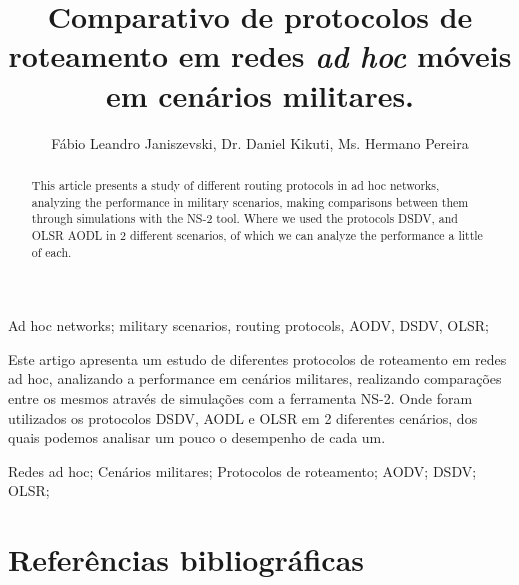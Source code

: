\documentclass[12pt]{article}
\title{Comparativo de protocolos de roteamento em redes \textit{ad hoc} m\'oveis em cen\'arios militares.}
\author{
	F\'abio Leandro Janiszevski\inst{1}, 
	Dr. Daniel Kikuti\inst{1}, 
	Ms. Hermano Pereira\inst{2}
}
\begin{document}
  \setlength{\leftmargini}{1.70cm}
  \setlength{\labelsep}{.5em}
  \setlength{\parindent}{1.27cm}
  \setlength{\parskip}{6pt}

\maketitle

\begin{abstract}
This article presents a study of different routing protocols in ad hoc networks, analyzing the performance in military scenarios, making comparisons between them through simulations with the NS-2 tool.
Where we used the protocols DSDV, and OLSR AODL in 2 different scenarios, of which we can analyze the performance a little of each.
\end{abstract}

\begin{keyWord}
Ad hoc networks; military scenarios, routing protocols, AODV, DSDV, OLSR;
\end{keyWord}

\begin{resumo}
Este artigo apresenta um estudo de diferentes protocolos de roteamento em redes ad hoc, analizando a performance em cen\'arios militares, realizando compara\c{c}\~oes entre os mesmos atrav\'es de simula\c{c}\~oes com a ferramenta NS-2. 
Onde foram utilizados os protocolos DSDV, AODL e OLSR em 2 diferentes cen\'arios, dos quais podemos analisar um pouco o desempenho de cada um.
\end{resumo}

\begin{palavraChave}
Redes ad hoc; Cen\'arios militares; Protocolos de roteamento; AODV; DSDV; OLSR;
\end{palavraChave}

\singlespacing

\newpage
\section{Refer\^encias bibliogr\'aficas}
%

\def\bibindent{0.5cm}
\renewcommand{\emph}{\textbf}

\end{document}
